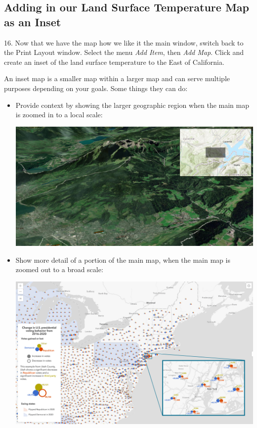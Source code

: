 \documentclass[oneside,a4paper,11pt,explicit]{book}
\begin{document}
\subsection{Adding in our Land Surface Temperature Map as an Inset}

16. Now that we have the map how we like it the main window, switch back to the Print Layout window. Select the menu \textit{Add Item}, then \textit{Add Map}. Click and create an inset of the land surface temperature to the East of California.

\begin{tcolorbox}[enhanced jigsaw,breakable,pad at break*=1mm,
  colback=yellow!5!white,colframe=IceCreamLeaf,title=Inset Maps]
  An inset map is a smaller map within a larger map and can serve multiple purposes depending on your goals. Some things they can do:
    \begin{itemize}
         \item Provide context by showing the larger geographic region when the main map is zoomed in to a local scale:

         \vspace{.25em}
         
         \centerline{\includegraphics[width=.85\textwidth]{inset-overview.png}}

         \item Show more detail of a portion of the main map, when the main map is zoomed out to a broad scale:

         \vspace{.25em}
         
         \centerline{\includegraphics[width=.85\textwidth]{inset-detail.png}}


\end{itemize}
\end{tcolorbox}
\end{document}

